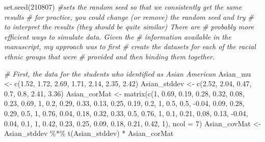 \documentclass[
  11pt,
]{book}
\newenvironment{Shaded}{\begin{snugshade}}{\end{snugshade}}
\newcommand{\AttributeTok}[1]{\textcolor[rgb]{0.77,0.63,0.00}{#1}}
\newcommand{\CommentTok}[1]{\textcolor[rgb]{0.56,0.35,0.01}{\textit{#1}}}
\newcommand{\DecValTok}[1]{\textcolor[rgb]{0.00,0.00,0.81}{#1}}
\newcommand{\FloatTok}[1]{\textcolor[rgb]{0.00,0.00,0.81}{#1}}
\newcommand{\FunctionTok}[1]{\textcolor[rgb]{0.00,0.00,0.00}{#1}}
\newcommand{\NormalTok}[1]{#1}
\newcommand{\OtherTok}[1]{\textcolor[rgb]{0.56,0.35,0.01}{#1}}
\newcommand{\SpecialCharTok}[1]{\textcolor[rgb]{0.00,0.00,0.00}{#1}}
\begin{document}
\begin{Shaded}
\begin{Highlighting}[]
\FunctionTok{set.seed}\NormalTok{(}\DecValTok{210807}\NormalTok{)  }\CommentTok{\#sets the random seed so that we consistently get the same results}
\CommentTok{\# for practice, you could change (or remove) the random seed and try}
\CommentTok{\# to interpret the results (they should be quite similar) There are}
\CommentTok{\# probably more efficient ways to simulate data. Given the}
\CommentTok{\# information available in the manuscript, my approach was to first}
\CommentTok{\# create the datasets for each of the racial ethnic groups that were}
\CommentTok{\# provided and then binding them together.}

\CommentTok{\# First, the data for the students who identified as Asian American}
\NormalTok{Asian\_mu }\OtherTok{\textless{}{-}} \FunctionTok{c}\NormalTok{(}\FloatTok{1.52}\NormalTok{, }\FloatTok{1.72}\NormalTok{, }\FloatTok{2.69}\NormalTok{, }\FloatTok{1.71}\NormalTok{, }\FloatTok{2.14}\NormalTok{, }\FloatTok{2.35}\NormalTok{, }\FloatTok{2.42}\NormalTok{)}
\NormalTok{Asian\_stddev }\OtherTok{\textless{}{-}} \FunctionTok{c}\NormalTok{(}\FloatTok{2.52}\NormalTok{, }\FloatTok{2.04}\NormalTok{, }\FloatTok{0.47}\NormalTok{, }\FloatTok{0.7}\NormalTok{, }\FloatTok{0.8}\NormalTok{, }\FloatTok{2.41}\NormalTok{, }\FloatTok{3.36}\NormalTok{)}
\NormalTok{Asian\_corMat }\OtherTok{\textless{}{-}} \FunctionTok{matrix}\NormalTok{(}\FunctionTok{c}\NormalTok{(}\DecValTok{1}\NormalTok{, }\FloatTok{0.69}\NormalTok{, }\FloatTok{0.19}\NormalTok{, }\FloatTok{0.28}\NormalTok{, }\FloatTok{0.32}\NormalTok{, }\FloatTok{0.08}\NormalTok{, }\FloatTok{0.23}\NormalTok{, }\FloatTok{0.69}\NormalTok{, }\DecValTok{1}\NormalTok{,}
    \FloatTok{0.2}\NormalTok{, }\FloatTok{0.29}\NormalTok{, }\FloatTok{0.33}\NormalTok{, }\FloatTok{0.13}\NormalTok{, }\FloatTok{0.25}\NormalTok{, }\FloatTok{0.19}\NormalTok{, }\FloatTok{0.2}\NormalTok{, }\DecValTok{1}\NormalTok{, }\FloatTok{0.5}\NormalTok{, }\FloatTok{0.5}\NormalTok{, }\SpecialCharTok{{-}}\FloatTok{0.04}\NormalTok{, }\FloatTok{0.09}\NormalTok{, }\FloatTok{0.28}\NormalTok{,}
    \FloatTok{0.29}\NormalTok{, }\FloatTok{0.5}\NormalTok{, }\DecValTok{1}\NormalTok{, }\FloatTok{0.76}\NormalTok{, }\FloatTok{0.04}\NormalTok{, }\FloatTok{0.18}\NormalTok{, }\FloatTok{0.32}\NormalTok{, }\FloatTok{0.33}\NormalTok{, }\FloatTok{0.5}\NormalTok{, }\FloatTok{0.76}\NormalTok{, }\DecValTok{1}\NormalTok{, }\FloatTok{0.1}\NormalTok{, }\FloatTok{0.21}\NormalTok{,}
    \FloatTok{0.08}\NormalTok{, }\FloatTok{0.13}\NormalTok{, }\SpecialCharTok{{-}}\FloatTok{0.04}\NormalTok{, }\FloatTok{0.04}\NormalTok{, }\FloatTok{0.1}\NormalTok{, }\DecValTok{1}\NormalTok{, }\FloatTok{0.42}\NormalTok{, }\FloatTok{0.23}\NormalTok{, }\FloatTok{0.25}\NormalTok{, }\FloatTok{0.09}\NormalTok{, }\FloatTok{0.18}\NormalTok{, }\FloatTok{0.21}\NormalTok{,}
    \FloatTok{0.42}\NormalTok{, }\DecValTok{1}\NormalTok{), }\AttributeTok{ncol =} \DecValTok{7}\NormalTok{)}
\NormalTok{Asian\_covMat }\OtherTok{\textless{}{-}}\NormalTok{ Asian\_stddev }\SpecialCharTok{\%*\%} \FunctionTok{t}\NormalTok{(Asian\_stddev) }\SpecialCharTok{*}\NormalTok{ Asian\_corMat}


\end{Highlighting}
\end{Shaded}
\end{document}
